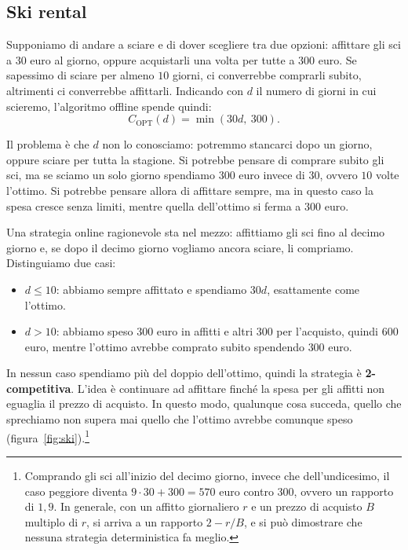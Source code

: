 \subsection{Ski rental}\label{sec:ski}
Supponiamo di andare a sciare e di dover scegliere tra due opzioni: affittare gli sci a $30$ euro al giorno, oppure acquistarli una volta per tutte a $300$ euro. Se sapessimo di sciare per almeno $10$ giorni, ci converrebbe comprarli subito, altrimenti ci converrebbe affittarli. Indicando con $d$ il numero di giorni in cui scieremo, l'algoritmo offline spende quindi:
\[
C_{\mathrm{OPT}}(d) = \min(30d,\ 300).
\]

Il problema è che $d$ non lo conosciamo: potremmo stancarci dopo un giorno, oppure sciare per tutta la stagione. Si potrebbe pensare di comprare subito gli sci, ma se sciamo un solo giorno spendiamo $300$ euro invece di $30$, ovvero $10$ volte l'ottimo. Si potrebbe pensare allora di affittare sempre, ma in questo caso la spesa cresce senza limiti, mentre quella dell'ottimo si ferma a $300$ euro.

Una strategia online ragionevole sta nel mezzo: affittiamo gli sci fino al decimo giorno e, se dopo il decimo giorno vogliamo ancora sciare, li compriamo. Distinguiamo due casi:
\begin{itemize}
    \item \textbf{$d \le 10$}: abbiamo sempre affittato e spendiamo $30d$, esattamente come l'ottimo.
    \item \textbf{$d > 10$}: abbiamo speso $300$ euro in affitti e altri $300$ per l'acquisto, quindi $600$ euro, mentre l'ottimo avrebbe comprato subito spendendo $300$ euro.
\end{itemize}
In nessun caso spendiamo più del doppio dell'ottimo, quindi la strategia è \textbf{2-competitiva}. L'idea è continuare ad affittare finché la spesa per gli affitti non eguaglia il prezzo di acquisto. In questo modo, qualunque cosa succeda, quello che sprechiamo non supera mai quello che l'ottimo avrebbe comunque speso (figura~\ref{fig:ski}).\footnote{Comprando gli sci all'inizio del decimo giorno, invece che dell'undicesimo, il caso peggiore diventa $9 \cdot 30 + 300 = 570$ euro contro $300$, ovvero un rapporto di $1{,}9$. In generale, con un affitto giornaliero $r$ e un prezzo di acquisto $B$ multiplo di $r$, si arriva a un rapporto $2 - r/B$, e si può dimostrare che nessuna strategia deterministica fa meglio.}

